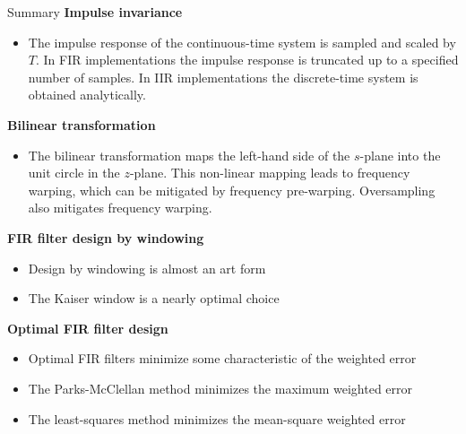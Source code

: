 \documentclass[10pt]{beamer}
\begin{document}
%
\begin{frame}{Summary}
	\textbf{Impulse invariance}
	\begin{itemize}
		\item The impulse response of the continuous-time system is sampled and scaled by $T$. In FIR implementations the impulse response is truncated up to a specified number of samples. In IIR implementations the discrete-time system is obtained analytically.
	\end{itemize}
	
	\textbf{Bilinear transformation}
	\begin{itemize}
		\item The bilinear transformation maps the left-hand side of the $s$-plane into the unit circle in the $z$-plane. This non-linear mapping leads to frequency warping, which can be mitigated by frequency pre-warping. Oversampling also mitigates frequency warping.
	\end{itemize}
	
	\textbf{FIR filter design by windowing}
	\begin{itemize}
		\item Design by windowing is almost an art form
		\item The Kaiser window is a nearly optimal choice
	\end{itemize}

	\textbf{Optimal FIR filter design}
	\begin{itemize}
		\item Optimal FIR filters minimize some characteristic of the weighted error
		\item The Parks-McClellan method minimizes the maximum weighted error
		\item The least-squares method minimizes the mean-square weighted error
	\end{itemize}	
\end{frame}
\end{document}
